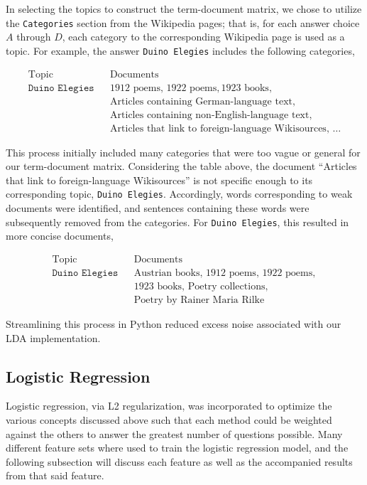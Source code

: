 \documentclass{article}
\theoremstyle{mystuff}
\theoremstyle{myexample}
\theoremstyle{named}
\begin{document}
In selecting the topics to construct the term-document matrix, we chose to utilize the \texttt{Categories} section from the Wikipedia pages; that is, for each answer choice $A$ through $D$, each category to the corresponding Wikipedia page is used as a topic. For example, the answer \texttt{Duino Elegies} includes the following categories, 

\[
	\begin{array}{lll}
		\text{Topic} & & \text{Documents} \\ \hline
		\texttt{Duino Elegies} & & \text{1912 poems}, \, \text{1922 poems}, \text{1923 books}, \\
		& & \text{Articles containing German-language text}, \\
		& &  \text{Articles containing non-English-language text}, \\
		& &  \text{Articles that link to foreign-language Wikisources}, \, \ldots
	\end{array}
\]

This process initially included many categories that were too vague or general for our term-document matrix. Considering the table above, the document ``Articles that link to foreign-language Wikisources'' is not specific enough to its corresponding topic, \texttt{Duino Elegies}. Accordingly, words corresponding to weak documents were identified, and sentences containing these words were subsequently removed from the categories. For \texttt{Duino Elegies}, this resulted in more concise documents,

\[
	\begin{array}{lll}
		\text{Topic} & & \text{Documents} \\ \hline
		\texttt{Duino Elegies} & & \text{Austrian books}, \, \text{1912 poems}, \, \text{1922 poems}, \\
		& & \text{1923 books}, \, \text{Poetry collections}, \\
		& & \text{Poetry by Rainer Maria Rilke}
	\end{array}
\]

\noindent Streamlining this process in Python reduced excess noise associated with our LDA implementation.


\subsection{Logistic Regression}
Logistic regression, via L2 regularization, was incorporated to optimize the various concepts discussed above such that each method could be weighted against the others to answer the greatest number of questions possible.  Many different feature sets where used to train the logistic regression model, and the following subsection will discuss each feature as well as the accompanied results from that said feature. \\
\end{document}
